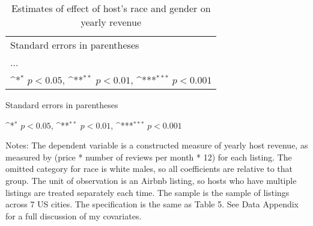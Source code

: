 \documentclass[11pt, oneside]{article}
\begin{document}
\begin{table}[htbp]\centering
	\def\sym#1{\ifmmode^{#1}\else\(^{#1}\)\fi}
	\caption{Estimates of effect of host's race and gender on yearly revenue}
	\begin{tabular}{l*{4}{c}}
		\hline\hline

	\hline\hline
	\multicolumn{5}{l}{\footnotesize Standard errors in parentheses}\\
	\multicolumn{5}{l}{\footnotesize ...}\\
	\multicolumn{5}{l}{\footnotesize \sym{*} \(p<0.05\), \sym{**} \(p<0.01\), \sym{***} \(p<0.001\)}\\
	\end{tabular}

	\begin{tablenotes}
		\item \footnotesize Standard errors in parentheses
		\item \footnotesize \sym{*} \(p<0.05\), \sym{**} \(p<0.01\), \sym{***} \(p<0.001\)
		\item Notes: The dependent variable is a constructed measure of yearly host revenue, as measured by (price * number of reviews per month * 12) for each listing. The omitted category for race is white males, so all coefficients are relative to that group. The unit of observation is an Airbnb listing, so hosts who have multiple listings are treated separately each time. The sample is the sample of listings across 7 US cities. The specification is the same as Table 5. See Data Appendix for a full discussion of my covariates.
	\end{tablenotes}
\end{table}
\end{document}
